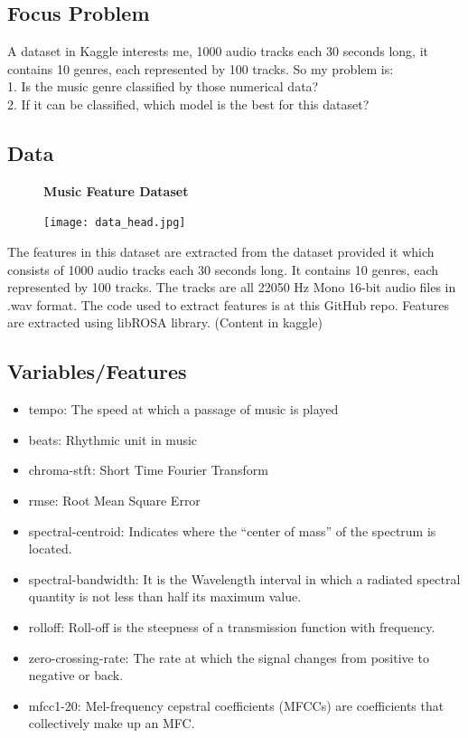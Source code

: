 \documentclass[12pt,a4paper]{article}
\begin{document}
\subsection{Focus Problem}
A dataset in Kaggle interests me, 1000 audio tracks each 30 seconds long, it contains 10 genres, each represented by 100 tracks. So my problem is:\\
1. Is the music genre classified by those numerical data?\\
2. If it can be classified, which model is the best for this dataset?

\subsection{Data}
\begin{figure}[h]
    \centering
    \textbf{Music Feature Dataset}\par\medskip
    \begin{center}
        \texttt{[image: data\_head.jpg]}
    \end{center}
\end{figure}

The features in this dataset are extracted from the dataset provided it which consists of 1000 audio tracks each 30 seconds long. It contains 10 genres, each represented by 100 tracks. The tracks are all 22050 Hz Mono 16-bit audio files in .wav format. The code used to extract features is at this GitHub repo. Features are extracted using libROSA library. (Content in kaggle)

\subsection{Variables/Features}
\begin{itemize}
  \item tempo: The speed at which a passage of music is played
  \item beats: Rhythmic unit in music
  \item chroma-stft: Short Time Fourier Transform
  \item rmse: Root Mean Square Error
  \item spectral-centroid: Indicates where the “center of mass” of the spectrum is located.
  \item spectral-bandwidth: It is the Wavelength interval in which a radiated spectral quantity is not less than half its maximum value.
  \item rolloff: Roll-off is the steepness of a transmission function with frequency.
  \item zero-crossing-rate: The rate at which the signal changes from positive to negative or back.
  \item mfcc1-20: Mel-frequency cepstral coefficients (MFCCs) are coefficients that collectively make up an MFC.
\end{itemize}
\end{document}
